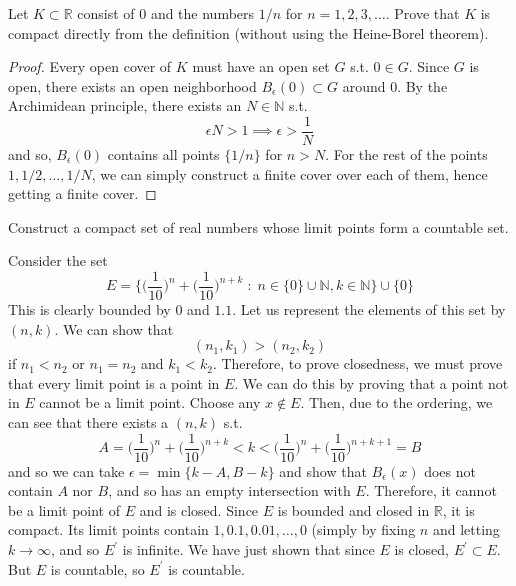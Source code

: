 \documentclass{article}
\begin{document}
    \begin{exercise}[Rudin 2.12]
    Let $K \subset \mathbb{R}$ consist of $0$ and the numbers $1/n$ for $n = 1, 2, 3, \ldots$. Prove that $K$ is compact directly from the definition (without using the Heine-Borel theorem). 
    \end{exercise}
    \begin{proof}
    Every open cover of $K$ must have an open set $G$ s.t. $0 \in G$. Since $G$ is open, there exists an open neighborhood $B_\epsilon (0) \subset G$ around $0$. By the Archimidean principle, there exists an $N \in \mathbb{N}$ s.t. 
    \[\epsilon N > 1 \implies \epsilon > \frac{1}{N}\]
    and so, $B_\epsilon (0)$ contains all points $\{1/n\}$ for $n > N$. For the rest of the points $1, 1/2, \ldots, 1/N$, we can simply construct a finite cover over each of them, hence getting a finite cover. 
    \end{proof}

    \begin{exercise}[Rudin 2.13]
    Construct a compact set of real numbers whose limit points form a countable set. 
    \end{exercise}
    \begin{solution}
    Consider the set 
    \[E = \bigg\{ \bigg( \frac{1}{10}\bigg)^n + \bigg( \frac{1}{10} \bigg)^{n+k} \; : \; n \in \{0\} \cup \mathbb{N}, k \in \mathbb{N} \bigg\} \cup \{0\}\]
    This is clearly bounded by $0$ and $1.1$. Let us represent the elements of this set by $(n, k)$. We can show that 
    \[(n_1, k_1) > (n_2, k_2)\]
    if $n_1 < n_2$ or $n_1 = n_2$ and $k_1 < k_2$. Therefore, to prove closedness, we must prove that every limit point is a point in $E$. We can do this by proving that a point not in $E$ cannot be a limit point. Choose any $x \not\in E$. Then, due to the ordering, we can see that there exists a $(n, k)$ s.t. 
    \[A = \bigg( \frac{1}{10}\bigg)^n + \bigg( \frac{1}{10} \bigg)^{n+k} < k < \bigg( \frac{1}{10}\bigg)^n + \bigg( \frac{1}{10} \bigg)^{n+k+1} = B\]
    and so we can take $\epsilon = \min\{k - A, B - k\}$ and show that $B_\epsilon (x)$ does not contain $A$ nor $B$, and so has an empty intersection with $E$. Therefore, it cannot be a limit point of $E$ and is closed. Since $E$ is bounded and closed in $\mathbb{R}$, it is compact. Its limit points contain $1, 0.1, 0.01, \ldots, 0$ (simply by fixing $n$ and letting $k \rightarrow \infty$, and so $E^\prime$ is infinite. We have just shown that since $E$ is closed, $E^\prime \subset E$. But $E$ is countable, so $E^\prime$ is countable. 
    \end{solution}
\end{document}
